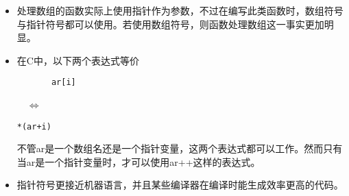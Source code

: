 \begin{frame}[fragile]
\begin{itemize}
\item 处理数组的函数实际上使用指针作为参数，不过在编写此类函数时，数组符号与指针符号都可以使用。若使用数组符号，则函数处理数组这一事实更加明显。\\[0.1in]
  
\item 在C中，以下两个表达式等价

\begin{minipage}{0.35\textwidth}
\begin{lstlisting}
       ar[i]
\end{lstlisting}
\end{minipage}
~~$\Longleftrightarrow$~~
\begin{minipage}{0.35\textwidth}
\begin{lstlisting}
*(ar+i)
\end{lstlisting}
\end{minipage}

不管{\tf ar}是一个数组名还是一个指针变量，这两个表达式都可以工作。然而只有当{\tf ar}是一个指针变量时，才可以使用{\tf ar++}这样的表达式。
\\[0.1in]
\item
指针符号更接近机器语言，并且某些编译器在编译时能生成效率更高的代码。
\end{itemize}
\end{frame}
